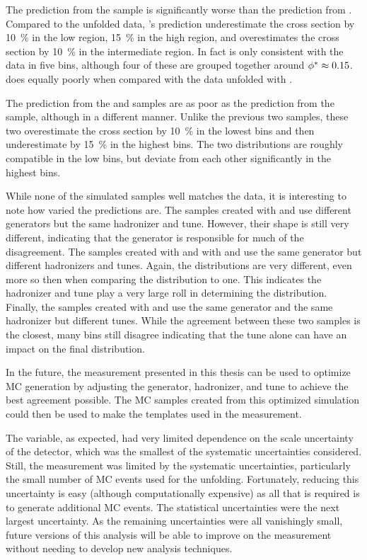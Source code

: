 The prediction from the \PPsixZtwo sample is significantly worse than the
prediction from \MADGRAPH. Compared to the \MADGRAPH unfolded data, \POWHEG's
prediction underestimate the cross section by \SI{10}{\percent} in the low
\phistar region, \SI{15}{\percent} in the high \phistar region, and
overestimates the cross section by \SI{10}{\percent} in the intermediate
region. In fact \POWHEG is only consistent with the data in five bins, although
four of these are grouped together around $\phi^{*} \approx 0.15$. \PPsixZtwo
does equally poorly when compared with the data unfolded with \PPsixZtwo.

The prediction from the \PPeightTTfive and \PPeightTTfourteen samples are as
poor as the prediction from the \PPsixZtwo sample, although in a different
manner. Unlike the previous two samples, these two overestimate the cross
section by \SI{10}{\percent} in the lowest \phistar bins and then underestimate
by \SI{15}{\percent} in the highest \phistar bins. The two distributions are
roughly compatible in the low \phistar bins, but deviate from each other
significantly in the highest bins.

While none of the simulated samples well matches the data, it is interesting to
note how varied the predictions are. The samples created with \MGsixZtwo and
\PPsixZtwo use different generators but the same hadronizer and tune. However,
their shape is still very different, indicating that the generator is
responsible for much of the disagreement. The samples created with \PPsixZtwo
and with \PPeightTTfive and \PPeightTTfourteen use the same generator but
different hadronizers and tunes. Again, the distributions are very different,
even more so then when comparing the \MADGRAPH distribution to \POWHEG one.
This indicates the hadronizer and tune play a very large roll in determining
the \phistar distribution. Finally, the samples created with \PPeightTTfive and
\PPeightTTfourteen use the same generator and the same hadronizer but different
tunes. While the agreement between these two samples is the closest, many bins
still disagree indicating that the tune alone can have an impact on the final
distribution.

In the future, the measurement presented in this thesis can be used to optimize
MC generation by adjusting the generator, hadronizer, and tune to achieve the
best agreement possible. The MC samples created from this optimized simulation
could then be used to make the templates used in the \MassW measurement.

The \phistar variable, as expected, had very limited dependence on the \pt
scale uncertainty of the detector, which was the smallest of the systematic
uncertainties considered. Still, the measurement was limited by the systematic
uncertainties, particularly the small number of MC events used for the
unfolding. Fortunately, reducing this uncertainty is easy (although
computationally expensive) as all that is required is to generate additional MC
events. The statistical uncertainties were the next largest uncertainty. As the
remaining uncertainties were all vanishingly small, future versions of this
analysis will be able to improve on the measurement without needing to develop
new analysis techniques.
